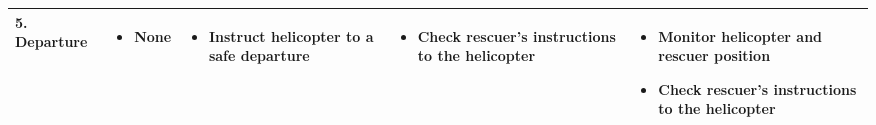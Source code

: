 \documentclass[a4paper,10pt]{scrartcl}
\begin{document}
\begin{landscape}
\begin{longtable}{|p{4cm}|p{4cm}|p{4cm}|p{4cm}|p{4cm}|}
 5. Departure &
 \begin{itemize}
    \item None
  \end{itemize} & 
   \begin{itemize}
    \item Instruct helicopter to a safe departure
  \end{itemize} & 
   \begin{itemize}
    \item Check rescuer's instructions to the helicopter
  \end{itemize} & 
   \begin{itemize}
    \item Monitor helicopter and rescuer position
    \item Check rescuer's instructions to the helicopter
  \end{itemize} \\
  \hline
   
\end{longtable}
\label{tab:exercise}

\end{landscape}
\end{document}

